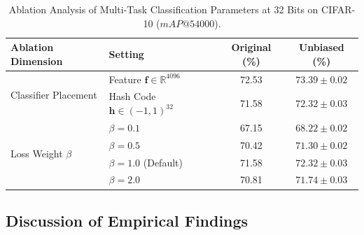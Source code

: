 \documentclass[10pt,conference]{IEEEtran}
\begin{document}
\begin{table}[h]
\centering
\caption{Ablation Analysis of Multi-Task Classification Parameters at 32 Bits on CIFAR-10 ($mAP@54000$).}
\label{tab:ablation_results}
\begin{tabular}{llcc}
\toprule
\textbf{Ablation Dimension} & \textbf{Setting} & \textbf{Original (\%)} & \textbf{Unbiased (\%)} \\
\midrule
\multirow{2}{*}{Classifier Placement} & Feature $\mathbf{f} \in \mathbb{R}^{4096}$ & 72.53 & $73.39 \pm 0.02$ \\
& Hash Code $\mathbf{h} \in (-1, 1)^{32}$ & 71.58 & $72.32 \pm 0.03$ \\
\midrule
\multirow{4}{*}{Loss Weight $\beta$} & $\beta = 0.1$ & 67.15 & $68.22 \pm 0.02$ \\
& $\beta = 0.5$ & 70.42 & $71.30 \pm 0.02$ \\
& $\beta = 1.0$ (Default) & 71.58 & $72.32 \pm 0.03$ \\
& $\beta = 2.0$ & 70.81 & $71.74 \pm 0.03$ \\
\bottomrule
\end{tabular}
\end{table}

\subsection{Discussion of Empirical Findings}
\end{document}
